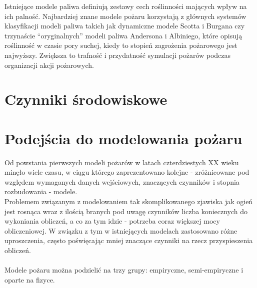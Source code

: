 \documentclass[a4paper, 11pt]{article}
\begin{document}
 Istniejące modele paliwa definiują zestawy cech roślinności mających wpływ na ich palność. Najbardziej znane modele pożaru korzystają z głównych systemów klasyfikacji modeli paliwa takich jak dynamiczne modele Scotta i Burgana czy trzynaście ``oryginalnych'' modeli paliwa Andersona i Albiniego, które opisują roślinność w czasie pory suchej, kiedy to stopień zagrożenia pożarowego jest najwyższy. Zwiększa to trafność i przydatność symulacji pożarów podczas organizacji akcji pożarowych.
	 
	
	
	
	
	
	
	
	
	\section*{Czynniki środowiskowe}
		
	\section*{Podejścia do modelowania pożaru}
	\indent
	
	Od powstania pierwszych modeli pożarów w latach czterdziestych XX wieku minęło wiele czasu, w ciągu którego zaprezentowano kolejne - zróżnicowane pod względem wymaganych danych wejściowych, znaczących czynników i stopnia rozbudowania - modele.\\
	\indent	Problemem związanym z modelowaniem tak skomplikowanego zjawiska jak ogień jest rosnąca wraz z ilością branych pod uwagę czynników liczba koniecznych do wykoniania obliczeń, a co za tym idzie - potrzeba coraz większej mocy obliczeniowej. W związku z tym w istniejących modelach zastosowano różne uproszczenia, często poświęcając mniej znaczące czynniki na rzecz przyspieszenia obliczeń.  \\
	\\
	Modele pożaru można podzielić na trzy grupy: empiryczne, semi-empiryczne i oparte na fizyce.
	
\end{document}
